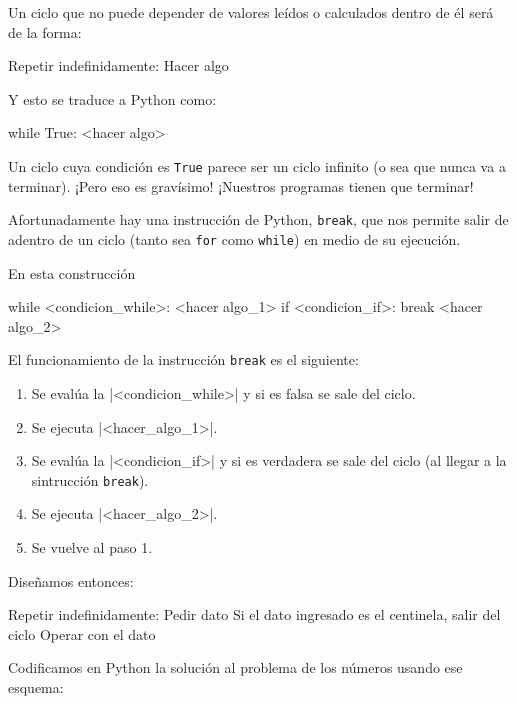 Un ciclo que no puede depender de valores leídos o calculados dentro
de él será de la forma:

\begin{codigo-nohl-sn}
Repetir indefinidamente:
    Hacer algo
\end{codigo-nohl-sn}

Y esto se traduce a Python como:

\begin{codigo-python-sn}
while True:
    <hacer algo>
\end{codigo-python-sn}

Un ciclo cuya condición es \lstinline!True! parece ser un ciclo infinito (o
sea que nunca va a terminar). ¡Pero eso es gravísimo! ¡Nuestros programas
tienen que terminar!

Afortunadamente hay una instrucción de Python, \lstinline!break!, que nos
permite salir de adentro de un ciclo (tanto sea \lstinline!for! como
\lstinline!while!) en medio de su ejecución.

En esta construcción

\begin{codigo-python-sn}
while <condicion_while>:
    <hacer algo_1>
    if <condicion_if>:
        break
    <hacer algo_2>
\end{codigo-python-sn}

El funcionamiento de la instrucción \lstinline!break! es el siguiente:

\begin{enumerate}
\item Se evalúa la |<condicion_while>| y si es falsa se sale del ciclo.
\item Se ejecuta |<hacer_algo_1>|.
\item Se evalúa la |<condicion_if>| y si es verdadera se sale del ciclo (al
    llegar a la sintrucción \lstinline!break!).
\item Se ejecuta |<hacer_algo_2>|.
\item Se vuelve al paso 1.
\end{enumerate}

Diseñamos entonces:

\begin{codigo-nohl-sn}
Repetir indefinidamente:
    Pedir dato
    Si el dato ingresado es el centinela, salir del ciclo
    Operar con el dato
\end{codigo-nohl-sn}

Codificamos en Python la solución al problema de los números usando ese
esquema:

